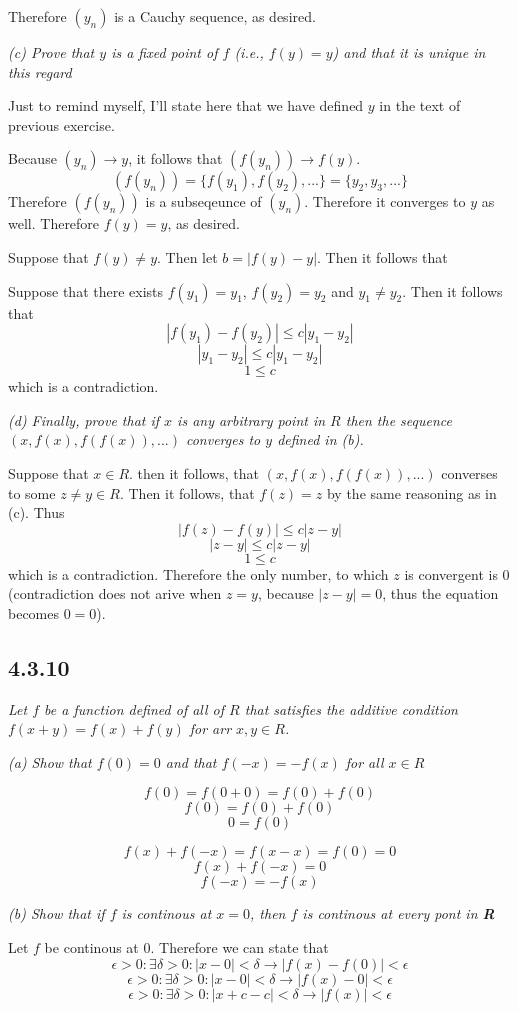 \documentclass[11pt,oneside,titlepage]{book}
\begin{document}
Therefore $(y_n)$ is a Cauchy sequence, as desired.

\textit{(c) Prove that $y$ is a fixed point of $f$ (i.e., $f(y) = y$) and that
  it is unique in this regard}

Just to remind myself, I'll state here that we have  defined $y$ in
the text of previous exercise.

Because $(y_n) \to y$, it follows that $(f(y_n)) \to f(y)$.
$$(f(y_n)) = \{f(y_1), f(y_2), ... \} = \{y_2, y_3, ... \}$$
Therefore $(f(y_n))$ is a subseqeunce of $(y_n)$. Therefore
it converges to $y$ as well. Therefore $f(y) = y$, as desired.

Suppose that $f(y) \neq y$. Then let $b = |f(y) - y|$. Then it follows that


Suppose that there exists  $f(y_1) = y_1$, $f(y_2) = y_2$ and $y_1 \neq y_2$.
Then it follows that 
$$|f(y_1) - f(y_2)| \leq c|y_1 - y_2|$$
$$|y_1 - y_2| \leq c|y_1 - y_2|$$
$$1 \leq c$$
which is a contradiction.

\textit{(d) Finally, prove that if $x$ is any arbitrary point in $R$ then the
  sequence $(x, f(x), f(f(x)), ...)$ converges to $y$ defined in (b).}

Suppose that $x \in R$. then it follows, that
$(x, f(x), f(f(x)), ... )$ converses to some $z \neq y \in R$. Then
it follows, that $f(z) = z$ by the same reasoning as in (c). Thus
$$|f(z) - f(y)| \leq c|z - y|$$
$$|z - y| \leq c|z - y|$$
$$1 \leq c$$
which is a contradiction. Therefore the only number, to which $z$ is convergent
is $0$ (contradiction does not arive when $z = y$, because $|z - y| = 0$,
thus the equation becomes $0 = 0$).

\subsection*{4.3.10}
\textit{Let $f$ be a function defined of all of $R$ that satisfies the additive
  condition $f(x + y) = f(x) + f(y)$ for arr $x, y \in R$.}

\textit{(a) Show that $f(0) = 0$ and that $f(-x) = -f(x)$ for all $x \in R$ }

$$f(0) = f(0 + 0) = f(0) + f(0)$$
$$f(0) = f(0) + f(0)$$
$$0  = f(0)$$

$$f(x) + f(-x) = f(x - x)  = f(0) = 0$$
$$f(x) + f(-x)  = 0$$
$$ f(-x)  = - f(x)$$

\textit{(b) Show that if $f$ is continous at $x = 0$, then $f$ is continous
  at every pont in \textbf{R}}

Let $f$ be continous at $0$. Therefore we can state that
$$\epsilon > 0: \exists \delta > 0: |x - 0| < \delta \to |f(x) - f(0)| < \epsilon$$
$$\epsilon > 0: \exists \delta > 0: |x - 0| < \delta \to |f(x) - 0| < \epsilon$$
$$\epsilon > 0: \exists \delta > 0: |x + c - c| < \delta \to |f(x)| < \epsilon$$
\end{document}
